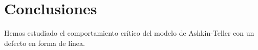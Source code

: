 \section{Conclusiones}

Hemos estudiado el comportamiento cr\'itico del modelo de Ashkin-Teller
con un defecto en forma de l\'inea.

